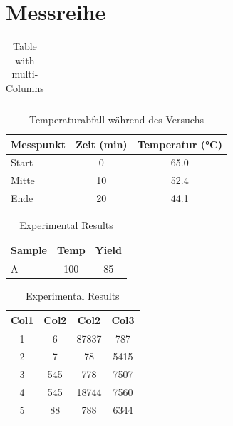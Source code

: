 \documentclass{scrartcl}
\begin{document}
\section{Messreihe}


\begin{table}[h] 
	\centering
	\caption{Table with multi-Columns}
	\begin{tabular}{ccc} %
		
		

	\end{tabular} 

\end{table} 


\begin{table}[htbp]
  \centering
  \label{tab:messung}
  \begin{tabularx}{\linewidth}{X S[table-format=2.0] S[table-format=2.1]}
    \toprule
    {Messpunkt} & {Zeit (min)} & {Temperatur (\si{\degreeCelsius})} \\
    \midrule
    Start   & 0  & 65.0 \\
    Mitte   & 10 & 52.4 \\
    Ende    & 20 & 44.1 \\
    \bottomrule
  \end{tabularx}
  \caption{Temperaturabfall während des Versuchs}
\end{table}

\begin{table}[htbp]
	\centering
	\caption{Experimental Results}
	\label{tab:results} %
	\begin{tabular}{l c c}
		\hline
		Sample & Temp & Yield \\
		\hline
		A & 100 & 85 \\
		\hline
	\end{tabular}
\end{table}


\begin{table}[h!]	
	\centering
	\caption{Experimental Results}
	\begin{tabular}{||c c c c||} 
		\hline
		Col1 & Col2 & Col2 & Col3 \\ [0.5ex] 
		\hline\hline
		1 & 6 & 87837 & 787 \\ 
		2 & 7 & 78 & 5415 \\
		3 & 545 & 778 & 7507 \\
		4 & 545 & 18744 & 7560 \\
		5 & 88 & 788 & 6344 \\ [1ex] 
		\hline
	\end{tabular}
\end{table}
\end{document}
